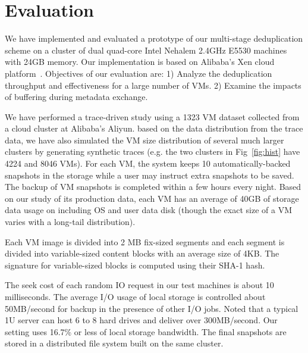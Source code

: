 
\section{Evaluation}
\label{sect:exper}

We have implemented and evaluated a prototype of our multi-stage deduplication scheme on a cluster
of dual quad-core Intel Nehalem 2.4GHz E5530 machines with 24GB memory.  
Our implementation is based on Alibaba's Xen cloud platform~\cite{Aliyun,WeiZhangIEEE}.
Objectives of our evaluation are:
1) Analyze the deduplication throughput and effectiveness for a large number of VMs.
2) Examine the impacts of buffering during metadata exchange.


We have performed a trace-driven study using  a 1323 VM dataset  collected from 
a cloud cluster at Alibaba's Aliyun. based on the data distribution from the
trace data, we have also simulated the VM size distribution of several much
larger clusters by generating synthetic traces (e.g. the two clusters in
Fig~\ref{fig:hist} have 4224 and 8046 VMs).
For each VM, the system keeps 10 automatically-backed snapshots in the storage
while a user may instruct extra snapshots to be saved.  The backup of VM
snapshots is completed within a few  hours every night.  Based on our study of
its production  data,  each VM has an average of 40GB of storage  data usage on
including OS and user data disk (though the exact size of a VM varies with a
long-tail distribution).

Each VM image is  divided into 2 MB fix-sized segments and each segment is divided into 
variable-sized content blocks  with an average size of 4KB.
The signature for variable-sized blocks is computed using their SHA-1 hash. 

The seek cost of each random IO request in our test machines is about  10 milliseconds.
The average I/O usage of local storage is controlled about 50MB/second for backup 
in the presence of other I/O jobs. Noted that a typical 1U server can host
6 to 8  hard drives and deliver over 300MB/second. Our setting uses 16.7\% or less 
of local storage bandwidth. 
The final snapshots are stored in a distributed file system built on the same 
cluster. 

